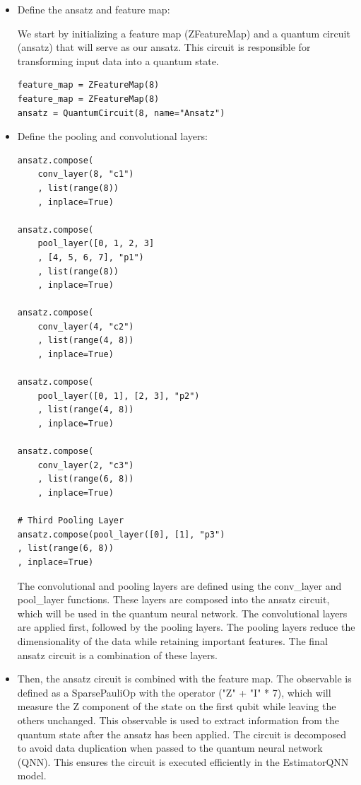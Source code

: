\documentclass[conference]{IEEEtran}
\begin{document}
\begin{itemize}
{\small
\begin{verbatim}
def callback_graph(
weights, obj_func_eval):
    clear_output(wait=True)
    objective_func_vals.append(
        obj_func_eval) 
\end{verbatim}}
    \item Define the ansatz and feature map:

    We start by initializing a feature map (ZFeatureMap) and a quantum circuit (ansatz) that will serve as our ansatz. This circuit is responsible for transforming input data into a quantum state.

{\small
\begin{verbatim}
feature_map = ZFeatureMap(8)
feature_map = ZFeatureMap(8)
ansatz = QuantumCircuit(8, name="Ansatz")
\end{verbatim}
}


\item Define the pooling and convolutional layers:
{\small
\begin{verbatim}
ansatz.compose(
    conv_layer(8, "c1")
    , list(range(8))
    , inplace=True)

ansatz.compose(
    pool_layer([0, 1, 2, 3]
    , [4, 5, 6, 7], "p1")
    , list(range(8))
    , inplace=True)

ansatz.compose(
    conv_layer(4, "c2")
    , list(range(4, 8))
    , inplace=True)

ansatz.compose(
    pool_layer([0, 1], [2, 3], "p2")
    , list(range(4, 8))
    , inplace=True)

ansatz.compose(
    conv_layer(2, "c3")
    , list(range(6, 8))
    , inplace=True)

# Third Pooling Layer
ansatz.compose(pool_layer([0], [1], "p3")
, list(range(6, 8))
, inplace=True)

\end{verbatim}}


    The convolutional and pooling layers are defined using the conv\_layer and pool\_layer functions. These layers are composed into the ansatz circuit, which will be used in the quantum neural network.
    The convolutional layers are applied first, followed by the pooling layers. The pooling layers reduce the dimensionality of the data while retaining important features. The final ansatz circuit is a combination of these layers.

    






    \item Then, the ansatz circuit is combined with the feature map. 
    The observable is defined as a SparsePauliOp \cite{qiskit_sparsepauliop} with the operator ("Z" + "I" * 7), which will measure the Z component of the state on the first qubit while leaving the others unchanged. This observable is used to extract information from the quantum state after the ansatz has been applied.
    The circuit is decomposed to avoid data duplication when passed to the quantum neural network (QNN). This ensures the circuit is executed efficiently in the EstimatorQNN \cite{qiskit_estimatorqnn} model.
    


\end{itemize}
\end{document}
